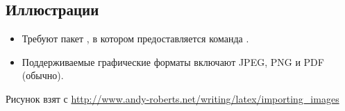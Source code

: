 \documentclass{beamer}
\begin{document}
\subsection{Иллюстрации}
\begin{frame}[fragile]{\insertsubsection}
\begin{itemize}
\item Требуют пакет , в котором предоставляется команда
.
\item Поддерживаемые графические форматы включают JPEG, PNG и PDF (обычно).
\end{itemize}

\tiny{Рисунок взят с \url{http://www.andy-roberts.net/writing/latex/importing_images}}
\end{frame}
\end{document}
